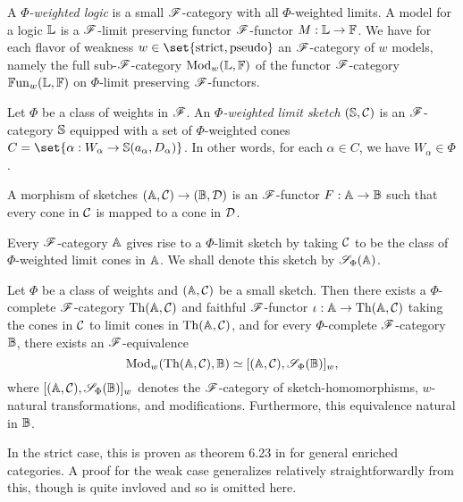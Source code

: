 \documentclass[../thesis.tex]{subfiles}
\begin{document}
  \begin{definition}[Logic]
    A \emph{$\Phi$-weighted logic} is a small ${\mathscr{F}}$-category with all $\Phi$-weighted limits. A model for a
    logic ${\mathbb{L}}$ is a ${\mathscr{F}}$-limit preserving functor ${\mathscr{F}}$-functor $M : {\mathbb{L}} \to {\mathbb{F}}$. We have for each flavor 
    of weakness $w \in \set{\text{strict}, \text{pseudo}}$ an ${\mathscr{F}}$-category of $w$ models, namely the full
    sub-${\mathscr{F}}$-category ${\mathrm{Mod}}_w({\mathbb{L}}, {\mathbb{F}})$ of the functor ${\mathscr{F}}$-category ${\mathbb{F}\mathrm{un}}_w({\mathbb{L}},{\mathbb{F}})$ on $\Phi$-limit
    preserving ${\mathscr{F}}$-functors.
  \end{definition}

  \begin{definition}
    Let $\Phi$ be a class of weights in ${\mathscr{F}}$. An \emph{$\Phi$-weighted limit sketch} $({\mathbb{S}},{\mathcal{C}})$ is an
    ${\mathscr{F}}$-category ${\mathbb{S}}$ equipped with a set of $\Phi$-weighted cones $C = \set{\alpha : W_\alpha \to \bS(
    a_\alpha,D_\alpha)}$. In other words, for each $\alpha \in C$, we have $W_\alpha \in \Phi$.

    A morphism of sketches $({\mathbb{A}},{\mathcal{C}}) \to ({\mathbb{B}}, {\mathcal{D}})$ is an ${\mathscr{F}}$-functor $F : {\mathbb{A}} \to {\mathbb{B}}$ such that every
    cone in ${\mathcal{C}}$ is mapped to a cone in ${\mathcal{D}}$.
  \end{definition}

  Every ${\mathscr{F}}$-category ${\mathbb{A}}$ gives rise to a $\Phi$-limit sketch by taking ${\mathcal{C}}$ to be the class of
  $\Phi$-weighted limit cones in ${\mathbb{A}}$. We shall denote this sketch by ${\mathscr{S}}_\Phi({\mathbb{A}})$.
  
  \begin{theorem}
    Let $\Phi$ be a class of weights and $({\mathbb{A}},{\mathcal{C}})$ be a small sketch. Then there exists a $\Phi$-complete
    ${\mathscr{F}}$-category ${\mathrm{Th}}({\mathbb{A}},{\mathcal{C}})$ and faithful ${\mathscr{F}}$-functor $\iota : {\mathbb{A}} \to {\mathrm{Th}}({\mathbb{A}},{\mathcal{C}})$ taking the cones
    in ${\mathcal{C}}$ to limit cones in ${\mathrm{Th}}({\mathbb{A}},{\mathcal{C}})$, and for every $\Phi$-complete ${\mathscr{F}}$-category ${\mathbb{B}}$, there exists
    an ${\mathscr{F}}$-equivalence
    \[{\mathrm{Mod}}_w({\mathrm{Th}}({\mathbb{A}},{\mathcal{C}}),{\mathbb{B}}) \simeq [({\mathbb{A}},{\mathcal{C}}), {\mathscr{S}}_\Phi({\mathbb{B}})]_w,\]
    where $[({\mathbb{A}},{\mathcal{C}}), {\mathscr{S}}_\Phi({\mathbb{B}})]_w$ denotes the ${\mathscr{F}}$-category of sketch-homomorphisms, $w$-natural
    transformations, and modifications. Furthermore, this equivalence natural in ${\mathbb{B}}$.
  \end{theorem}
  \begin{remark}
    In the strict case, this is proven as theorem 6.23 in \cite{kelly1982a} for general enriched categories.
    A proof for the weak case generalizes relatively straightforwardly from this, though is quite invloved
    and so is omitted here.
  \end{remark}
\end{document}
